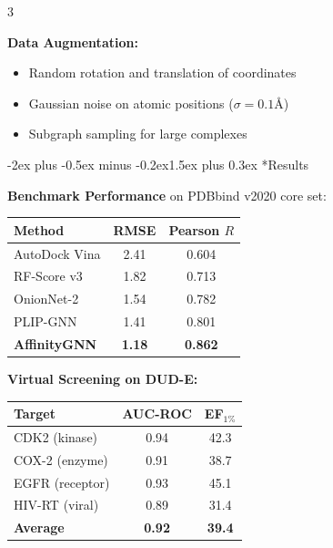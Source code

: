 \documentclass[a0paper,portrait]{article}
\makeatletter
\renewcommand{\section}{\@startsection{section}{1}{0pt}%
  {-2ex plus -0.5ex minus -0.2ex}{1.5ex plus 0.3ex}%
  {\fontsize{40}{48}\selectfont\bfseries\color{sectioncolor}}}
\newcommand{\posterbody}{\fontsize{28}{38}\selectfont}
\newcommand{\postertable}{\fontsize{26}{34}\selectfont}
\makeatother
\begin{document}
\begin{multicols}{3}
\vspace{1cm}

\textbf{Data Augmentation:}
\begin{itemize}[leftmargin=1.5em, itemsep=10pt]
  \item Random rotation and translation of coordinates
  \item Gaussian noise on atomic positions ($\sigma = 0.1$\AA)
  \item Subgraph sampling for large complexes
\end{itemize}

\columnbreak

\section*{Results}

\posterbody

\textbf{Benchmark Performance} on PDBbind v2020 core set:

\vspace{1cm}

\begin{center}
\renewcommand{\arraystretch}{1.6}
{\postertable
\begin{tabular}{@{}lcc@{}}
\toprule
\textbf{Method} & \textbf{RMSE} & \textbf{Pearson $R$} \\
\midrule
AutoDock Vina  & 2.41 & 0.604 \\
RF-Score v3    & 1.82 & 0.713 \\
OnionNet-2     & 1.54 & 0.782 \\
PLIP-GNN       & 1.41 & 0.801 \\
\midrule
\textbf{AffinityGNN} & \textbf{1.18} & \textbf{0.862} \\
\bottomrule
\end{tabular}}
\end{center}

\vspace{2cm}

\textbf{Virtual Screening on DUD-E:}

\vspace{1cm}

\begin{center}
\renewcommand{\arraystretch}{1.6}
{\postertable
\begin{tabular}{@{}lcc@{}}
\toprule
\textbf{Target} & \textbf{AUC-ROC} & \textbf{EF$_{1\%}$} \\
\midrule
CDK2 (kinase)     & 0.94 & 42.3 \\
COX-2 (enzyme)    & 0.91 & 38.7 \\
EGFR (receptor)   & 0.93 & 45.1 \\
HIV-RT (viral)    & 0.89 & 31.4 \\
\midrule
\textbf{Average}  & \textbf{0.92} & \textbf{39.4} \\
\bottomrule
\end{tabular}}
\end{center}


\end{multicols}
\end{document}

